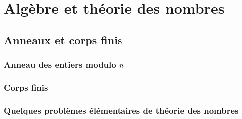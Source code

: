 \part{Algèbre et théorie des nombres}
\chapter{Anneaux et corps finis}
\section{Anneau des entiers modulo $n$}
\section{Corps finis}
\section{Quelques probl\`emes élémentaires de théorie des nombres}
